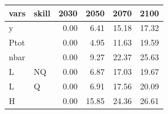 \begin{tabular}{llrrrr}
  \hline
vars & skill & 2030 & 2050 & 2070 & 2100 \\ 
  \hline
y &  & 0.00 & 6.41 & 15.18 & 17.32 \\ 
  Ptot &  & 0.00 & 4.95 & 11.63 & 19.59 \\ 
  nbar &  & 0.00 & 9.27 & 22.37 & 25.63 \\ 
  L & NQ & 0.00 & 6.87 & 17.03 & 19.67 \\ 
  L & Q & 0.00 & 6.91 & 17.56 & 20.09 \\ 
  H &  & 0.00 & 15.85 & 24.36 & 26.61 \\ 
   \hline
\end{tabular}
